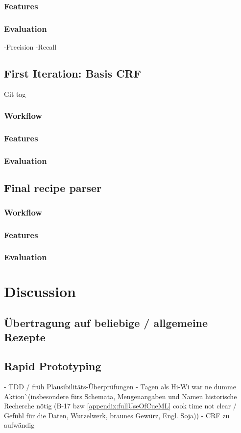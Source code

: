 \documentclass[12pt, twoside]{report}
\begin{document}
\subsection{Features}
\subsection{Evaluation}
-Precision -Recall

\section{First Iteration: Basis CRF}
Git-tag
\subsection{Workflow}
\subsection{Features}
\subsection{Evaluation}

\section{Final recipe parser}
\subsection{Workflow}
\subsection{Features}
\subsection{Evaluation}




\chapter{Discussion}
\section{Übertragung auf beliebige / allgemeine Rezepte}

\section{Rapid Prototyping}
- TDD / früh Plausibilitäts-Überprüfungen - Tagen als Hi-Wi war ne dumme Aktion^^ (insbesondere fürs Schemata, Mengenangaben und Namen historische Recherche nötig (B-17 bzw \cref{appendix:fullUseOfCueML} cook time not clear / Gefühl für die Daten, Wurzelwerk, braunes Gewürz,	Engl. Soja))
- CRF zu aufwändig 
\end{document}
